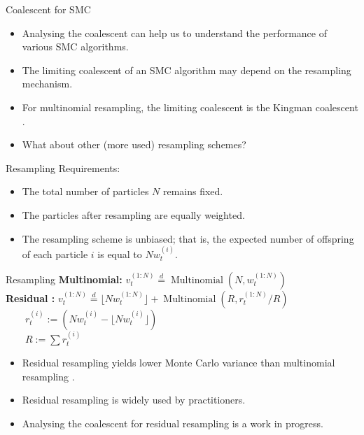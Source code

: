 \documentclass[aspectratio=169]{beamer}
\theoremstyle{definition}
\newcommand{\eqdist}{\overset{d}{=}}
\newcommand{\vt}[2][t]{v_{#1}^{(#2)}}
\newcommand{\wt}[2][t]{w_{#1}^{(#2)}}
\begin{document}
\begin{frame}{Coalescent for SMC}
\begin{itemize}
\item Analysing the coalescent can help us to understand the performance of various SMC algorithms.
\item The limiting coalescent of an SMC algorithm may depend on the resampling mechanism.
\item For multinomial resampling, the limiting coalescent is the Kingman coalescent \cite{koskela2018}.
\item What about other (more used) resampling schemes?
\end{itemize}
\end{frame}

\begin{frame}{Resampling}
Requirements:\\[12pt]
\begin{itemize}
\item The total number of particles $N$ remains fixed. 
\item The particles after resampling are equally weighted. 
\item The resampling scheme is unbiased; that is, the expected number of offspring of each particle $i$ is equal to $N\wt{i}$.
\end{itemize}
\end{frame}

\begin{frame}{Resampling}
\textbf{Multinomial:}
$\vt{1:N} \eqdist \operatorname{Multinomial}(N, \wt{1:N})$\\[12pt]
\pause
\textbf{Residual \cite{liu1998}:}
$\vt{1:N} \eqdist \lfloor N \wt{1:N} \rfloor +  \operatorname{Multinomial}(R, r_t^{(1:N)}/R)$\\[7pt]
$\qquad r_t^{(i)} := (N \wt{i} - \lfloor N \wt{i}\rfloor)$\\[7pt]
$\qquad R:= \sum r_t^{(i)}$\\[12pt]
\pause
\begin{itemize}
\item Residual resampling yields lower Monte Carlo variance than multinomial resampling \cite{douc2005}.
\item Residual resampling is widely used by practitioners.
\item Analysing the coalescent for residual resampling is a work in progress.
\end{itemize}
\end{frame}
\end{document}
